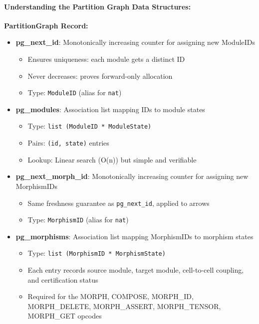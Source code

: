 \paragraph{Understanding the Partition Graph Data Structures:}
\textbf{PartitionGraph Record:}
\begin{itemize}
    \item \textbf{pg\_next\_id}: Monotonically increasing counter for assigning new ModuleIDs
    \begin{itemize}
        \item Ensures uniqueness: each module gets a distinct ID
        \item Never decreases: proves forward-only allocation
        \item Type: \texttt{ModuleID} (alias for \texttt{nat})
    \end{itemize}
    \item \textbf{pg\_modules}: Association list mapping IDs to module states
    \begin{itemize}
        \item Type: \texttt{list (ModuleID * ModuleState)}
        \item Pairs: \texttt{(id, state)} entries
        \item Lookup: Linear search (O(n)) but simple and verifiable
    \end{itemize}
    \item \textbf{pg\_next\_morph\_id}: Monotonically increasing counter for assigning new MorphismIDs
    \begin{itemize}
        \item Same freshness guarantee as \texttt{pg\_next\_id}, applied to arrows
        \item Type: \texttt{MorphismID} (alias for \texttt{nat})
    \end{itemize}
    \item \textbf{pg\_morphisms}: Association list mapping MorphismIDs to morphism states
    \begin{itemize}
        \item Type: \texttt{list (MorphismID * MorphismState)}
        \item Each entry records source module, target module, cell-to-cell coupling, and certification status
        \item Required for the MORPH, COMPOSE, MORPH\_ID, MORPH\_DELETE, MORPH\_ASSERT, MORPH\_TENSOR, MORPH\_GET opcodes
    \end{itemize}
\end{itemize}

